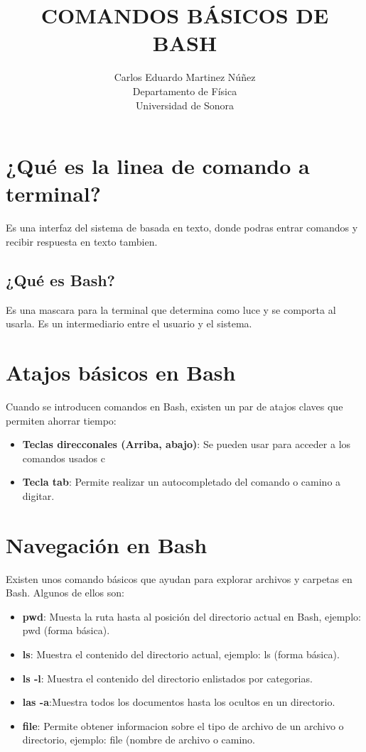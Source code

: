 \documentclass[a4paper,12pt]{article}
\title{\textbf{COMANDOS BÁSICOS DE BASH}}
\author{Carlos Eduardo Martinez Núñez\\
Departamento de Física\\
Universidad de Sonora}
\begin{document}
\maketitle

\section{¿Qué es la linea de comando a terminal?}

Es una interfaz del sistema de basada en texto, donde podras entrar comandos y recibir respuesta en texto tambien.
\subsection{¿Qué es Bash?}
Es una mascara para la terminal que determina como luce y se comporta al usarla. Es un intermediario entre el usuario y el sistema.

\section{Atajos básicos en Bash}

Cuando se introducen comandos en Bash, existen un par de atajos claves que permiten ahorrar tiempo:

\begin{itemize}
\item{\textbf{Teclas direcconales (Arriba, abajo)}}: Se pueden usar para acceder a los comandos usados c
\item{\textbf{Tecla tab}}: Permite realizar un autocompletado del comando o camino a digitar.
\end{itemize}

\section{Navegación en Bash}

Existen unos comando básicos que ayudan para explorar archivos y carpetas en Bash. Algunos de ellos son: 

\begin{itemize}
\item{\textbf{pwd}}: Muesta la ruta hasta al posición del directorio actual en Bash, ejemplo: pwd (forma básica).
\item{\textbf{ls}}: Muestra el contenido del directorio actual, ejemplo: ls (forma básica).
\item{\textbf{ls -l}}: Muestra el contenido del directorio enlistados por categorias.
\item{\textbf{las -a}}:Muestra todos los documentos hasta los ocultos en un directorio.
\item{\textbf{file}}: Permite obtener informacion sobre el tipo de archivo de un archivo o directorio, ejemplo: file (nombre de archivo o camino.
\end{itemize}
\end{document}

